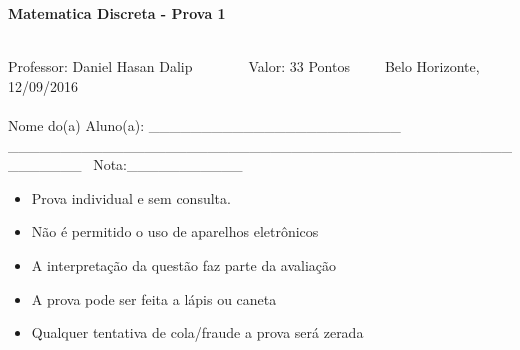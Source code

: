 \documentclass[16pt]{examdesign}
\begin{document}
\begin{examtop}

      
    \begin{multicols}{2}[]
    \begin{minipage}{2.5cm}
    \end{minipage}
      \columnbreak
      \begin{minipage}{400px}
      \begin{center}\large{\textbf{Matematica Discreta - Prova 1}}\end{center}~\\
      Professor: Daniel Hasan Dalip~~~~~~~~Valor: 33 Pontos~~~~~Belo Horizonte, 12/09/2016\\~\\
      Nome do(a) Aluno(a): \_\_\_\_\_\_\_\_\_\_\_\_\_\_\_\_\_\_\_\_\_\_\_\_	\_\_\_\_\_\_\_\_\_\_\_\_\_\_\_\_\_\_\_\_\_\_\_\_\_\_\_\_\_\_\_\_\_\_\_\_\_\_\_\_\_\_\_\_\_\_\_\_\_\_\_\_\_\_\_~
      Nota:\_\_\_\_\_\_\_\_\_\_\_\\       
      \end{minipage}



    \end{multicols}
  \hrulefill
  \begin{multicols}{2}[]
  
    \begin{itemize}
    \item Prova individual e sem consulta.\vspace{-6pt}
    \item Não é permitido o uso de aparelhos eletrônicos  \vspace{-6pt}
    \item A interpretação da questão faz parte da avaliação  \vspace{-6pt}
    \item A prova pode ser feita a lápis ou caneta  \vspace{-6pt}
    \item Qualquer tentativa de cola/fraude a prova será zerada  \vspace{-6pt}
    \end{itemize}
  \end{multicols}

\def\arraystretch{1}
\end{examtop}
\end{document}
